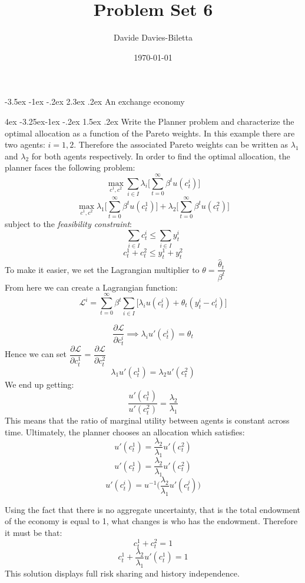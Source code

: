 \documentclass[10pt]{article}
\title{Problem Set 6}
\author{Davide Davies-Biletta}
\date{\today}
\makeatletter
\newcommand{\bb}{\bigbreak\noindent}
\renewcommand\section{\leftskip 0pt\@startsection {section}{1}{\z@}%
	{-3.5ex \@plus -1ex \@minus -.2ex}%
	{2.3ex \@plus.2ex}%
	{\normalfont\Large\bfseries}}
\renewcommand\subsection{\leftskip 4ex\@startsection{subsection}{2}{\z@}%
	{-3.25ex\@plus -1ex \@minus -.2ex}%
	{1.5ex \@plus .2ex}%
	{\normalfont\large\bfseries}}
\makeatother
\begin{document}
	\maketitle
	\setcounter{page}{1}
	\begin{spacing}{1.5}
		
		
\section{An exchange economy}

	\subsection{Write the Planner problem and characterize the optimal allocation as a function of the Pareto weights.}
	In this example there are two agents: $i = 1,2$. Therefore the associated Pareto weights can be written as $\lambda_1$ and $\lambda_2$ for both agents respectively. In order to find the optimal allocation, the planner faces the following problem: 
	\[ \max_{c^1,c^2} \sum_{i\in I} \lambda_i\big[\sum_{t=0}^{\infty}\beta^t u(c^i_t)\big] \]
	\[ \max_{c^1,c^2} \lambda_1\big[\sum_{t=0}^{\infty}\beta^t u(c^1_t)\big] + \lambda_2\big[\sum_{t=0}^{\infty}\beta^t u(c^2_t)\big] \]
	subject to the \textit{feasibility constraint}:
	\[ \sum_{i\in I}c^i_t \leq  \sum_{i\in I}y^i_t\]
	\[ c^1_t+c^2_t \leq y^1_t+y^2_t\]
	\bb
	To make it easier, we set the Lagrangian multiplier to $\theta = \dfrac{\hat{\theta}_t }  {\beta^t}$\\
	From here we can create a Lagrangian function:
	\[ \mathcal{L}^i = \sum_{t=0}^{\infty} \beta^t \sum_{i\in I}\big[\lambda_iu(c^i_t)+ \theta_t  (y^i_t - c_t^i)\big] \]
	
	\[ \frac{\partial \mathcal{L}}{\partial{c_t^i}} \implies  \lambda_iu'(c^i_t) =  \theta_t  \]
	Hence we can set $\dfrac{\partial \mathcal{L}}{\partial{c_t^1}}$ = $\dfrac{\partial \mathcal{L}}{\partial{c_t^2}}$
	\[ \lambda_1u'(c^1_t) = \lambda_2u'(c^2_t) \]
	We end up getting:
	\[ \frac{u'(c^1_t)}{u'(c^2_t)} = \frac{\lambda_2}{\lambda_1}  \]
	This means that the ratio of marginal utility between agents is constant across time.
	\bb
	Ultimately, the planner chooses an allocation which satisfies: 
	\[ u'(c^1_t) = \frac{\lambda_2}{\lambda_1} u'(c^2_t) \]
	\[ u'(c^1_t) = \frac{\lambda_2}{\lambda_1} u'(c^2_t) \]
	\[ u'(c^i_t) = u^{-1}\big(\frac{\lambda_2}{\lambda_1} u'(c^j_t)\big) \]
	
	Using the fact that there is no aggregate uncertainty, that is the total endowment of the economy
	is equal to 1, what changes is who has the endowment. Therefore it must be that:
	\[ c^1_t + c^2_t = 1\]
	\[ c^1_t + \frac{\lambda_2}{\lambda_1} u'(c^1_t) = 1\]
	This solution displays full risk sharing and history independence.
	

\end{spacing}
\end{document}
